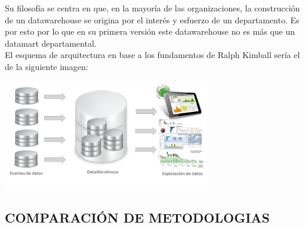 \documentclass[%
 reprint,
 amsmath,amssymb,
 aps,
]{revtex4-1}
\begin{document}
Su filosofía se centra en que, en la mayoría de las organizaciones, la construcción de un datawarehouse se origina por el interés y esfuerzo de un departamento. Es por esto por lo que en su primera versión este datawarehouse no es más que un datamart departamental.\\

El esquema de arquitectura en base a los fundamentos de Ralph Kimball sería el de la siguiente imagen:

     				\begin{center}
					\includegraphics[width=9cm]{./IMAGENES/arquitectura}
				\end{center}

 


\subsection{COMPARACIÓN DE METODOLOGIAS}	
\end{document}
